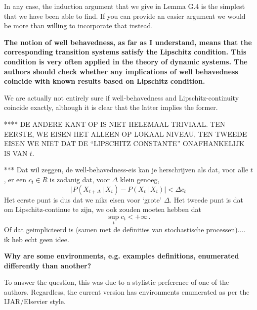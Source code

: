 \documentclass[twoside,11pt]{letter}
\begin{document}
In any case, the induction argument that we give in Lemma G.4 is the simplest that we have been able to find. If you can provide an easier argument we would be more than willing to incorporate that instead.

{\bf The notion of well behavedness, as far as I understand, means that the corresponding transition systems satisfy the Lipschitz condition. 
This condition is very often applied in the theory of dynamic systems. 
The authors should check whether any implications of well behavedness coincide with known results based on Lipschitz condition.  }

We are actually not entirely sure if well-behavedness and Lipschitz-continuity coincide exactly, although it is clear that the latter implies the former.

**** DE ANDERE KANT OP IS NIET HELEMAAL TRIVIAAL. TEN EERSTE, WE EISEN HET ALLEEN OP LOKAAL NIVEAU, TEN TWEEDE EISEN WE NIET DAT DE ``LIPSCHITZ CONSTANTE'' ONAFHANKELIJK IS VAN $t$. 

*** Dat wil zeggen, de well-behavedness-eis kan je herschrijven als dat, voor alle $t$, er een $c_t\in R$ is zodanig dat, voor $\Delta$ klein genoeg,
\begin{equation}
\lvert P(X_{t+\Delta}\,\vert\,X_t) - P(X_{t}\,\vert\,X_t) \rvert < \Delta c_t
\end{equation}
Het eerste punt is dus dat we niks eisen voor `grote' $\Delta$. Het tweede punt is dat om Lipschitz-continue te zijn, we ook zouden moeten hebben dat
\begin{equation*}
\sup_{t} c_t < +\infty\,.
\end{equation*}
Of dat geimplicteerd is (samen met de definities van stochastische processen).... ik heb echt geen idee.

{\bf Why are some environments, e.g. examples definitions, enumerated differently than another? }

To answer the question, this was due to a stylistic preference of one of the authors. Regardless, the current version has environments enumerated as per the IJAR/Elsevier style.
\end{document}
